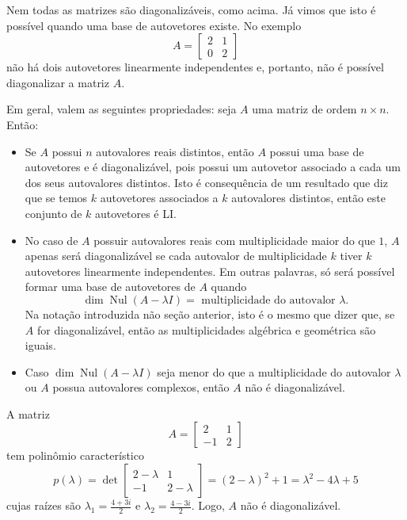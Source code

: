 Nem todas as matrizes são diagonalizáveis, como acima. Já vimos que isto é possível quando uma base de autovetores existe. No exemplo
\begin{equation}
A = \begin{bmatrix}
2&1 \\ 0&2
\end{bmatrix}
\end{equation} não há dois autovetores linearmente independentes e, portanto, não é possível diagonalizar a matriz $A$.


\vspace{0.3cm}

Em geral, valem as seguintes propriedades: seja $A$ uma matriz de ordem $n \times n$. Então:
\begin{itemize}
	\item Se $A$ possui $n$ autovalores reais distintos, então $A$ possui uma base de autovetores e é diagonalizável, pois possui um autovetor associado a cada um dos seus autovalores distintos. Isto é consequência de um resultado que diz que se temos $k$ autovetores associados a $k$ autovalores distintos, então este conjunto de $k$ autovetores é LI.
	\item No caso de $A$ possuir autovalores reais com multiplicidade maior do que $1$, $A$ apenas será diagonalizável se cada autovalor de multiplicidade $k$ tiver $k$ autovetores linearmente independentes. Em outras palavras, só será possível formar uma base de autovetores de $A$ quando
	\begin{equation}
	\operatorname{dim} \operatorname{Nul} (A - \lambda I) = \text{ multiplicidade do autovalor } \lambda.
	\end{equation} Na notação introduzida não seção anterior, isto é o mesmo que dizer que, se $A$ for diagonalizável, então as multiplicidades algébrica e geométrica são iguais.
	\item Caso $\dim \operatorname{Nul} (A - \lambda I)$ seja menor do que a multiplicidade do autovalor $\lambda$ ou $A$ possua autovalores complexos, então $A$ não é diagonalizável.
\end{itemize}


\begin{ex}
	A matriz
	\begin{equation}
	A = \begin{bmatrix}
	2&1 \\ -1&2
	\end{bmatrix}
	\end{equation} tem polinômio característico
	\begin{equation}
	p(\lambda) = \det \begin{bmatrix}
	2-\lambda&1 \\ -1&2-\lambda
	\end{bmatrix} = (2-\lambda)^2 +1 = \lambda^2 -4\lambda +5
	\end{equation} cujas raízes são $\lambda_1 = \frac{4 + 3i}{2}$ e $\lambda_2 = \frac{4 - 3i}{2}$. Logo, $A$ não é diagonalizável.
\end{ex}

